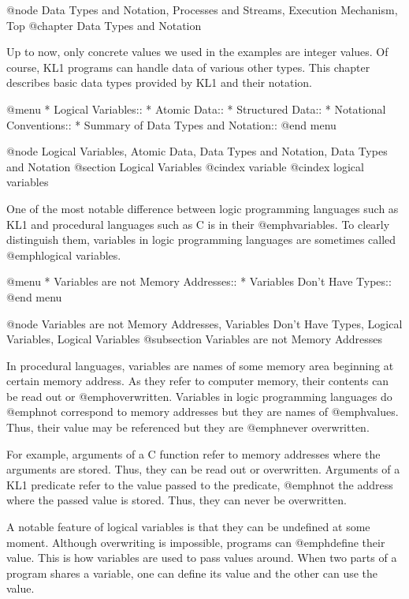 @node Data Types and Notation, Processes and Streams, Execution Mechanism, Top
@chapter Data Types and Notation

Up to now, only concrete values we used in the examples are integer
values.  Of course, KL1 programs can handle data of various other
types.  This chapter describes basic data types provided by KL1 and
their notation.

@menu
* Logical Variables::           
* Atomic Data::                 
* Structured Data::             
* Notational Conventions::      
* Summary of Data Types and Notation::  
@end menu

@node Logical Variables, Atomic Data, Data Types and Notation, Data Types and Notation
@section Logical Variables
@cindex variable
@cindex logical variables

One of the most notable difference between logic programming languages
such as KL1 and procedural languages such as C is in their
@emph{variables}.  To clearly distinguish them, variables in logic
programming languages are sometimes called @emph{logical variables}.

@menu
* Variables are not Memory Addresses::  
* Variables Don't Have Types::  
@end menu

@node Variables are not Memory Addresses, Variables Don't Have Types, Logical Variables, Logical Variables
@subsection Variables are not Memory Addresses

In procedural languages, variables are names of some memory area
beginning at certain memory address.  As they refer to computer memory,
their contents can be read out or @emph{overwritten}.  Variables in
logic programming languages do @emph{not} correspond to memory addresses
but they are names of @emph{values}.  Thus, their value may be
referenced but they are @emph{never overwritten}.

For example, arguments of a C function refer to memory addresses where
the arguments are stored.  Thus, they can be read out or overwritten.
Arguments of a KL1 predicate refer to the value passed to the predicate,
@emph{not} the address where the passed value is stored.  Thus, they can
never be overwritten.

A notable feature of logical variables is that they can be undefined at
some moment.  Although overwriting is impossible, programs can
@emph{define} their value.  This is how variables are used to pass
values around.  When two parts of a program shares a variable, one can
define its value and the other can use the value.

